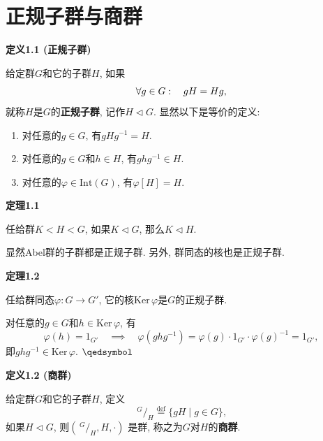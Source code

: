\documentclass[UTF8]{ctexart}
\begin{document}
\setlength{\abovedisplayskip}{1pt}
\setlength{\belowdisplayskip}{1pt}

\section{正规子群与商群}

\hypertarget{sec:定义1.1}{}
\noindent\textbf{定义1.1 (正规子群)}

给定群$G$和它的子群$H$, 如果
\vspace{-3pt}
\[
    \forall g\in G:\quad gH=Hg,\\[-3pt]
\]
就称$H$是$G$的\textbf{正规子群}, 记作$H\lhd G$. 显然以下是等价的定义:
\begin{enumerate}
    \item 对任意的$g\in G$, 有$gHg^{-1}=H$.
    \item 对任意的$g\in G$和$h\in H$, 有$ghg^{-1}\in H$.
    \item 对任意的$\varphi\in\mathrm{Int}(G)$, 有$\varphi[H]=H$.
\end{enumerate}

\vspace{10pt}

\hypertarget{sec:定理1.1}{}
\noindent\textbf{定理1.1}

任给群$K<H<G$, 如果$K\lhd G$, 那么$K\lhd H$.

\vspace{10pt}

显然Abel群的子群都是正规子群. 另外, 群同态的核也是正规子群.

\vspace{10pt}

\hypertarget{sec:定理1.2}{}
\noindent\textbf{定理1.2}

任给群同态$\varphi:G\to G'$, 它的核$\mathrm{Ker}\,\varphi$是$G$的正规子群.


对任意的$g\in G$和$h\in\mathrm{Ker}\,\varphi$, 有
\[
    \varphi(h)=1_{G'}\quad\implies\quad
    \varphi(ghg^{-1})=\varphi(g)\cdot1_{G'}\cdot\varphi(g)^{-1}=1_{G'},
\]
即$ghg^{-1}\in\mathrm{Ker}\,\varphi$. \hfill $\qedsymbol$

\vspace{10pt}

\hypertarget{sec:定义1.2}{}
\noindent\textbf{定义1.2 (商群)}

给定群$G$和它的子群$H$, 定义
\[
    \,\!^{\displaystyle G}\!/_{\displaystyle H}\overset{\mathrm{def}}{=}
    \{gH\mid g\in G\},
\]
如果$H\lhd G$,
则$\left(\,\!^{\displaystyle G}\!/_{\displaystyle H},H,\cdot\right)$
是群, 称之为$G$对$H$的\textbf{商群}.
\end{document}
